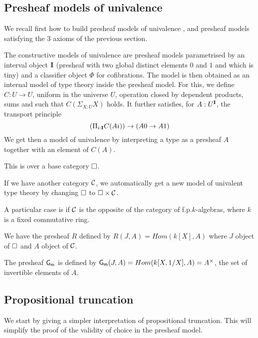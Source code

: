 
    \subsection{Presheaf models of univalence}

    We recall first how to build presheaf models of univalence \cite{CCHM,survey},
    and presheaf models satisfying the 3 axioms of the previous section.

The constructive models of univalence are presheaf models parametrised by an interval object $\mathbf{I}$
(presheaf with two global distinct elements $0$ and $1$ and which is tiny) and a classifier object
$\Phi$ for cofibrations. The model is then obtained as an internal model of type theory inside the
presheaf model. For this, we define $C:U\rightarrow U$, uniform in the universe $U$, operation
closed by dependent products, sums and such that $C(\Sigma_{X:U}X)$ holds. It further satisfies, for $A:U^{\mathbf{I}}$, the transport principle
$$
(\Pi_{i:\mathbf{I}}C(Ai))\rightarrow (A0\rightarrow A1)
$$
We get then a model of univalence by interpreting a type as a presheaf $A$ together with an element
of $C(A)$.

 This is over a base category $\square$.
 
 If we have another category $\mathcal{C}$, we automatically get a new model of univalent type theory by
 changing $\square$ to $\square\times\mathcal{C}$.

 A particular case is if $\mathcal{C}$ is the opposite of the category of f.p.\@ $k$-algebras, where $k$ is a
 fixed commutative ring.

 We have the presheaf $R$ defined by $R(J,A) = Hom(k[X],A)$ where $J$ object of $\square$ and $A$ object of $\mathcal{C}$.

  The presheaf $\mathsf{G_m}$ is defined by $\mathsf{G_m}(J,A) = Hom(k[X,1/X],A) = A^{\times}$, the set of invertible elements of $A$.

\subsection{Propositional truncation}

    We start by giving a simpler interpretation of propositional truncation. This will simplify
    the proof of the validity of choice in the presheaf model.

